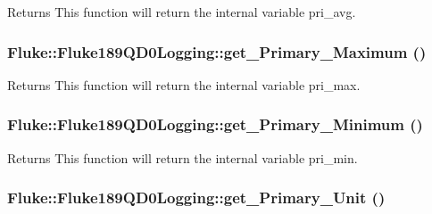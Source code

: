 \label{classFluke_1_1Fluke189QD0Logging_a29473a5a7d016d020f0948fcf3e31e50}
\begin{DoxyReturn}{Returns}
This function will return the internal variable pri\_\-avg. 
\end{DoxyReturn}
\hypertarget{classFluke_1_1Fluke189QD0Logging_a7da9ac7b5617e427cdfc1b09d6bd4373}{
\subsubsection[{get\_\-Primary\_\-Maximum}]{ Fluke::Fluke189QD0Logging::get\_\-Primary\_\-Maximum ()}}
\label{classFluke_1_1Fluke189QD0Logging_a7da9ac7b5617e427cdfc1b09d6bd4373}
\begin{DoxyReturn}{Returns}
This function will return the internal variable pri\_\-max. 
\end{DoxyReturn}
\hypertarget{classFluke_1_1Fluke189QD0Logging_a61180ec1e3f4ffc507c5cc92bfa61952}{
\subsubsection[{get\_\-Primary\_\-Minimum}]{ Fluke::Fluke189QD0Logging::get\_\-Primary\_\-Minimum ()}}
\label{classFluke_1_1Fluke189QD0Logging_a61180ec1e3f4ffc507c5cc92bfa61952}
\begin{DoxyReturn}{Returns}
This function will return the internal variable pri\_\-min. 
\end{DoxyReturn}
\hypertarget{classFluke_1_1Fluke189QD0Logging_a864f0f60f6995d5d035163caf0651565}{
\subsubsection[{get\_\-Primary\_\-Unit}]{ Fluke::Fluke189QD0Logging::get\_\-Primary\_\-Unit ()}}
